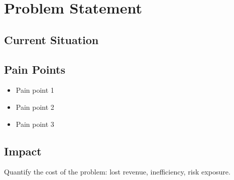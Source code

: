 \section{Problem Statement}

\subsection{Current Situation}


\subsection{Pain Points}

\begin{itemize}
    \item Pain point 1
    \item Pain point 2
    \item Pain point 3
\end{itemize}

\subsection{Impact}


\begin{businessvalue}
Quantify the cost of the problem: lost revenue, inefficiency, risk exposure.
\end{businessvalue}
